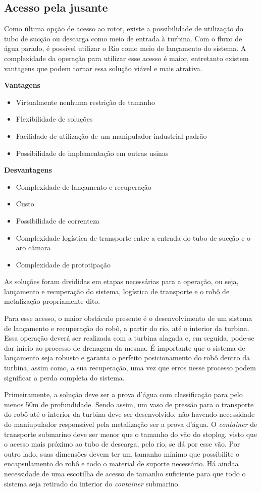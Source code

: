 \subsection{Acesso pela jusante}
Como última opção de acesso ao rotor, existe a possibilidade de utilização do
tubo de sucção ou descarga como meio de entrada à turbina. Com o fluxo de água
parado, é possível utilizar o Rio como meio de lançamento do sistema. A
complexidade da operação para utilizar esse acesso é maior, entretanto existem
vantagens que podem tornar essa solução viável e mais atrativa.

\textbf{Vantagens}
\begin{itemize}
  \item Virtualmente nenhuma restrição de tamanho
  \item Flexibilidade de soluções
  \item Facilidade de utilização de um manipulador industrial padrão
  \item Possibilidade de implementação em outras usinas
\end{itemize}

\textbf{Desvantagens}
\begin{itemize}
  \item Complexidade de lançamento e recuperação
  \item Custo
  \item Possibilidade de correnteza
  \item Complexidade logística de transporte entre a entrada do tubo de sucção e
  o aro câmara
  \item Complexidade de prototipação
\end{itemize}

As soluções foram divididas em etapas necessárias para a operação, ou
seja, lançamento e recuperação do sistema, logística de transporte e o robô de
metalização propriamente dito.

Para esse acesso, o maior obstáculo presente é o desenvolvimento de um sistema
de lançamento e recuperação do robô, a partir do rio, até o interior da turbina.
Essa operação deverá ser realizada com a turbina alagada e, em seguida,
pode-se dar início ao processo de drenagem da
mesma.
É importante que o sistema de lançamento seja robusto e garanta o perfeito posicionamento do robô dentro da turbina, assim
como, a sua recuperação, uma vez que erros nesse processo podem significar a
perda completa do sistema.

Primeiramente, a solução deve ser a prova d'água com classificação para pelo
menos 50m de profundidade.
Sendo assim, um vaso de pressão para o transporte do robô até o interior da turbina deve ser
desenvolvido, não havendo necessidade do maniupulador responsável pela
metalização ser a prova d'água. O \textit{container} de transporte
submarino deve ser menor que o tamanho do vão do stoplog, visto que o acesso
mais próximo ao tubo de descarga, pelo rio, se dá por esse vão.
Por outro lado, suas dimensões devem ter um tamanho mínimo que possibilite o
encapsulamento do robô e todo o material de suporte necessário. Há aindaa
necessidade de uma escotilha de acesso de tamanho suficiente para que todo o
sistema seja retirado do interior do \textit{container} submarino.

